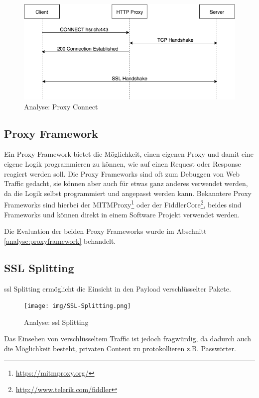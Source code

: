 \begin{figure}[H]
	\centering
	\includegraphics[width=\textwidth]{img/HTTP-Connect.png}
	\caption{Analyse: Proxy Connect}
	\label{fig:proxyconnect}
\end{figure}


\subsection{Proxy Framework}
Ein Proxy Framework bietet die Möglichkeit, einen eigenen Proxy und damit eine eigene Logik programmieren zu können, wie auf einen Request oder Response reagiert werden soll.
Die Proxy Frameworks sind oft zum Debuggen von Web Traffic gedacht, sie können aber auch für etwas ganz anderes verwendet werden, da die Logik selbst programmiert und angepasst werden kann.
Bekanntere Proxy Frameworks sind hierbei der MITMProxy\footnote{\url{https://mitmproxy.org/}} oder der FiddlerCore\footnote{\url{http://www.telerik.com/fiddler}}, beides sind Frameworks und können direkt in einem Software Projekt verwendet werden.

Die Evaluation der beiden Proxy Frameworks wurde im Abschnitt \ref{analyse:proxyframework} behandelt.

\newpage
\subsection{SSL Splitting}
\label{analyse:ssl}
\gls{ssl} Splitting\cite{sslsplit} ermöglicht die Einsicht in den Payload verschlüsselter Pakete.


\begin{figure}[H]
	\centering
	\texttt{[image: img/SSL-Splitting.png]}
	\caption{Analyse: \gls{ssl} Splitting}
	\label{fig:sslsplitting}
\end{figure}

Das Einsehen von verschlüsseltem Traffic ist jedoch fragwürdig, da dadurch auch die Möglichkeit besteht, privaten Content zu protokollieren z.B. Passwörter.


